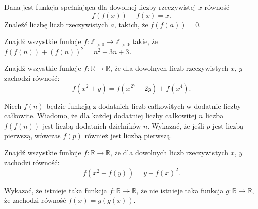 \begin{problem}{1}
	Dana jest funkcja spełniająca dla dowolnej liczby rzeczywistej $x$ równość
	\[
		f(f(x)) - f(x) = x.
	\]
	Znaleźć liczbę liczb rzeczywistych $a$, takich, że $f(f(a)) = 0$.
\end{problem}

\begin{problem}{2}
	Znajdź wszystkie funkcje  $ f: \mathbb{Z}_{>0} \to \mathbb{Z}_{>0}$ takie, że  $f(f(n)) + (f(n))^2 = n^2 + 3n + 3$.
\end{problem}

\begin{problem}{3}
	Znajdź wszystkie funkcje $f:\mathbb{R}\longrightarrow\mathbb{R}$, że dla dowolnych liczb rzeczywistych $x$, $y$ zachodzi równość:
	\[
		f(x^2 + y) = f(x^{27} + 2y) + f(x^4).
	\]
\end{problem}

\begin{problem}{4}
	Niech $f(n)$ będzie funkcją z dodatnich liczb całkowitych w dodatnie liczby całkowite. Wiadomo, że dla każdej dodatniej liczby całkowitej $n$ liczba  $f(f(n))$ jest liczbą dodatnich dzielników $n$. Wykazać, że jeśli $p$ jest liczbą pierwszą, wówczas $f(p)$ również jest liczbą pierwszą.
\end{problem}

\begin{problem}{5}
	Znajdź wszystkie funkcje $f:\mathbb{R}\longrightarrow\mathbb{R}$, że dla dowolnych liczb rzeczywistych $x$, $y$ zachodzi równość:
	\[
		f(x^2+f(y))=y+f(x)^2.
	\]
\end{problem}

\begin{problem}{6}
	Wykazać, że istnieje taka funkcja $f:\mathbb{R}\longrightarrow\mathbb{R}$, że nie istnieje taka funkcja $g:\mathbb{R}\longrightarrow\mathbb{R}$, że zachodzi równość $f(x) = g(g(x))$.
\end{problem}


